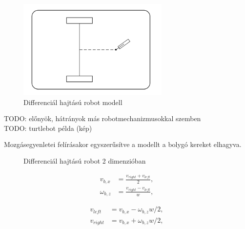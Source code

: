 \begin{figure}[!ht]
    \centering
    \includegraphics[width=75mm, keepaspectratio]{figures/025_diff_model.png}
    \caption{Differenciál hajtású robot modell \cite{siciliano2010robotics}}
    \label{fig:025_diff_model}
\end{figure}

TODO: előnyök, hátrányok más robotmechanizmusokkal szemben \\
TODO: turtlebot példa (kép)

Mozgásegyenletei felírásakor egyszerűsítve a modellt a bolygó kereket elhagyva.

\begin{figure}[!ht]
    \centering
    
    \caption{Differenciál hajtású robot 2 dimenzióban \cite{ros2_control_docs}}
    \label{fig:022_diff_drive}
\end{figure}

\begin{align}
    v_{b,x}      & = \frac{v_{right} + v_{left}}{2}, \\
    \omega_{b,z} & = \frac{v_{right} - v_{left}}{w},
\end{align}

\begin{align}
    v_{left}  & = v_{b,x} - \omega_{b,z} w / 2, \\
    v_{right} & = v_{b,x} + \omega_{b,z} w / 2,
\end{align}
